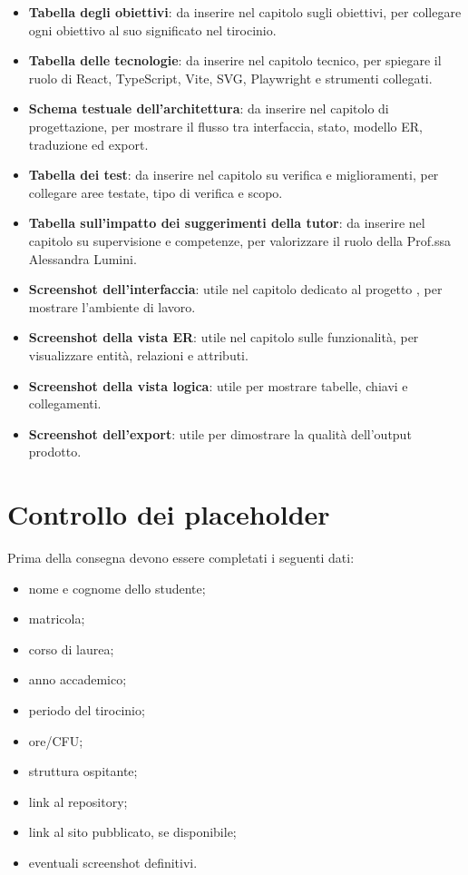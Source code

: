 \begin{itemize}
    \item \textbf{Tabella degli obiettivi}: da inserire nel capitolo sugli obiettivi, per collegare ogni obiettivo al suo significato nel tirocinio.
    \item \textbf{Tabella delle tecnologie}: da inserire nel capitolo tecnico, per spiegare il ruolo di React, TypeScript, Vite, SVG, Playwright e strumenti collegati.
    \item \textbf{Schema testuale dell'architettura}: da inserire nel capitolo di progettazione, per mostrare il flusso tra interfaccia, stato, modello ER, traduzione ed export.
    \item \textbf{Tabella dei test}: da inserire nel capitolo su verifica e miglioramenti, per collegare aree testate, tipo di verifica e scopo.
    \item \textbf{Tabella sull'impatto dei suggerimenti della tutor}: da inserire nel capitolo su supervisione e competenze, per valorizzare il ruolo della Prof.ssa Alessandra Lumini.
    \item \textbf{Screenshot dell'interfaccia}: utile nel capitolo dedicato al progetto \builder, per mostrare l'ambiente di lavoro.
    \item \textbf{Screenshot della vista ER}: utile nel capitolo sulle funzionalità, per visualizzare entità, relazioni e attributi.
    \item \textbf{Screenshot della vista logica}: utile per mostrare tabelle, chiavi e collegamenti.
    \item \textbf{Screenshot dell'export}: utile per dimostrare la qualità dell'output prodotto.
\end{itemize}

\section{Controllo dei placeholder}

Prima della consegna devono essere completati i seguenti dati:

\begin{itemize}
    \item nome e cognome dello studente;
    \item matricola;
    \item corso di laurea;
    \item anno accademico;
    \item periodo del tirocinio;
    \item ore/CFU;
    \item struttura ospitante;
    \item link al repository;
    \item link al sito pubblicato, se disponibile;
    \item eventuali screenshot definitivi.
\end{itemize}

